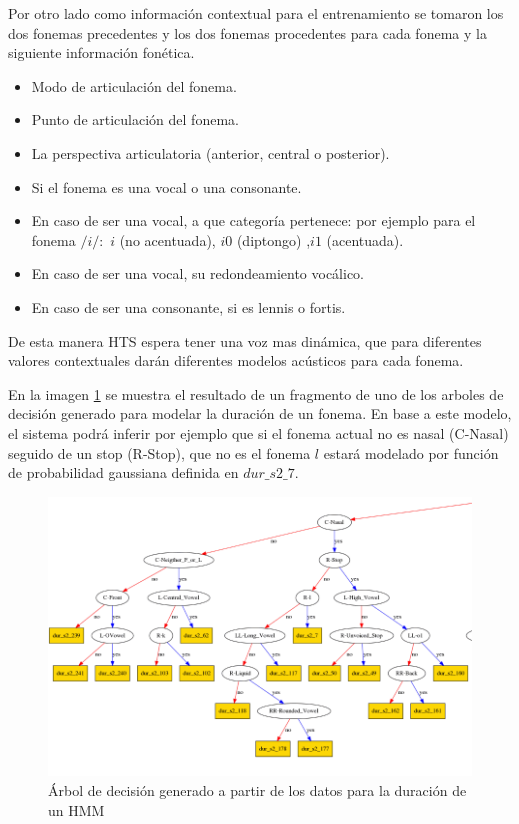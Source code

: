Por otro lado como información contextual para el entrenamiento se tomaron los dos fonemas precedentes y los dos fonemas procedentes para cada fonema y la siguiente información fonética.

\begin{itemize}
\item Modo de articulación del fonema.
\item Punto de articulación del fonema.
\item La perspectiva articulatoria (anterior, central o posterior).
\item Si el fonema es una vocal o una consonante.
\item En caso de ser una vocal, a que categoría pertenece: por ejemplo para el fonema $/i/:$ {$i$ (no acentuada), $i0$ (diptongo) ,$i1$ (acentuada)}.
\item En caso de ser una vocal, su redondeamiento vocálico.
\item En caso de ser una consonante, si es lennis o fortis.
\end{itemize}

De esta manera HTS espera tener una voz mas dinámica, que para diferentes valores contextuales darán diferentes modelos acústicos para cada fonema.

En la imagen \ref{genTree} se muestra el resultado de un fragmento de uno de los arboles de decisión generado para modelar la duración de un fonema. En base a este modelo, el sistema podrá inferir por ejemplo que si el fonema actual no es nasal (C-Nasal) seguido de un stop (R-Stop), que no es el fonema $l$ estará modelado por función de probabilidad gaussiana definida en $dur\_s2\_7$.

\begin{figure}
\begin{center}
\includegraphics[scale=0.4]{imagenes/arbolDeDesicionTesis.png}
\caption{Árbol de decisión generado a partir de los datos para la duración de un HMM}
\label{genTree}
\end{center}
\end{figure}

